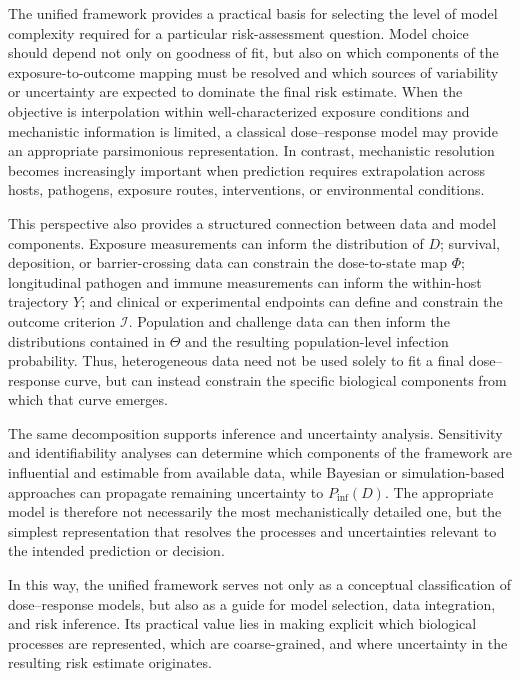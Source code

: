 \documentclass[11pt]{article}
\begin{document}
The unified framework provides a practical basis for selecting the level of
model complexity required for a particular risk-assessment question. Model
choice should depend not only on goodness of fit, but also on which components
of the exposure-to-outcome mapping must be resolved and which sources of
variability or uncertainty are expected to dominate the final risk estimate.
When the objective is interpolation within well-characterized exposure
conditions and mechanistic information is limited, a classical dose--response
model may provide an appropriate parsimonious representation. In contrast,
mechanistic resolution becomes increasingly important when prediction requires
extrapolation across hosts, pathogens, exposure routes, interventions, or
environmental conditions.

This perspective also provides a structured connection between data and model
components. Exposure measurements can inform the distribution of $D$;
survival, deposition, or barrier-crossing data can constrain the dose-to-state
map $\Phi$; longitudinal pathogen and immune measurements can inform the
within-host trajectory $Y$; and clinical or experimental endpoints can define
and constrain the outcome criterion $\mathcal{I}$. Population and challenge
data can then inform the distributions contained in $\Theta$ and the resulting
population-level infection probability. Thus, heterogeneous data need not be
used solely to fit a final dose--response curve, but can instead constrain the
specific biological components from which that curve emerges.

The same decomposition supports inference and uncertainty analysis. Sensitivity
and identifiability analyses can determine which components of the framework
are influential and estimable from available data, while Bayesian or
simulation-based approaches can propagate remaining uncertainty to
$P_{\mathrm{inf}}(D)$. The appropriate model is therefore not necessarily the
most mechanistically detailed one, but the simplest representation that
resolves the processes and uncertainties relevant to the intended prediction
or decision.

In this way, the unified framework serves not only as a conceptual
classification of dose--response models, but also as a guide for model
selection, data integration, and risk inference. Its practical value lies in
making explicit which biological processes are represented, which are
coarse-grained, and where uncertainty in the resulting risk estimate
originates.
\end{document}
